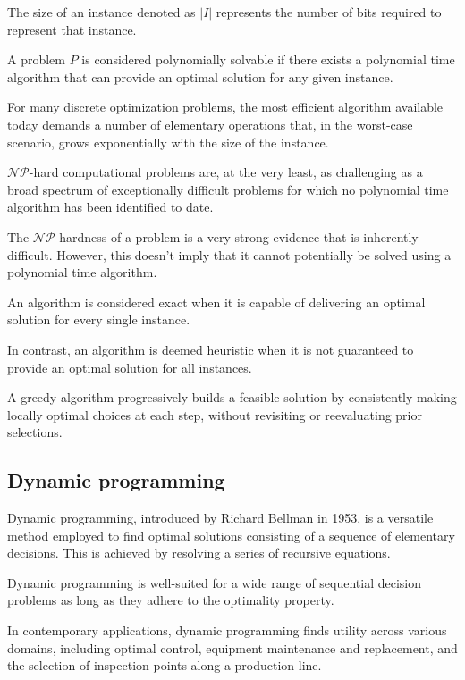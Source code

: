 \begin{definition}
    The size of an instance denoted as $\left\lvert I \right\rvert$ represents the number of bits required to represent that instance.
\end{definition}
\begin{definition}
    A problem $P$ is considered polynomially solvable if there exists a polynomial time algorithm that can provide an optimal solution for any given instance.
\end{definition}
For many discrete optimization problems, the most efficient algorithm available today demands a number of elementary operations that, in the worst-case scenario, grows exponentially with the size of the instance.
\begin{definition}
    $\mathcal{NP}$-hard computational problems are, at the very least, as challenging as a broad spectrum of exceptionally difficult problems for which no polynomial time algorithm has been identified to date.
\end{definition}
The $\mathcal{N}\mathcal{P}$-hardness of a problem is a very strong evidence that is inherently difficult. 
However, this doesn't imply that it cannot potentially be solved using a polynomial time algorithm.

\begin{definition}
    An algorithm is considered exact when it is capable of delivering an optimal solution for every single instance.
\end{definition}
\begin{definition}
    In contrast, an algorithm is deemed heuristic when it is not guaranteed to provide an optimal solution for all instances.
\end{definition}
\begin{definition}
    A greedy algorithm progressively builds a feasible solution by consistently making locally optimal choices at each step, without revisiting or reevaluating prior selections.
\end{definition}

\subsection{Dynamic programming}
Dynamic programming, introduced by Richard Bellman in 1953, is a versatile method employed to find optimal solutions consisting of a sequence of elementary decisions.
This is achieved by resolving a series of recursive equations.

Dynamic programming is well-suited for a wide range of sequential decision problems as long as they adhere to the optimality property.

In contemporary applications, dynamic programming finds utility across various domains, including optimal control, equipment maintenance and replacement, and the selection of inspection points along a production line.